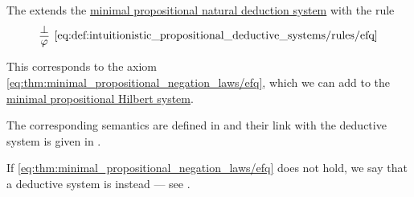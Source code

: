 \begin{definition}\label{def:intuitionistic_propositional_deductive_systems}
  The  extends the \hyperref[def:minimal_propositional_natural_deduction_system]{minimal propositional natural deduction system} with the rule
  \begin{equation*}\taglabel[\logic{EFQ}]{eq:def:intuitionistic_propositional_deductive_systems/rules/efq}
    \begin{prooftree}
      \hypo{ \bot }
      \infer1[\ref{eq:def:intuitionistic_propositional_deductive_systems/rules/efq}]{ \varphi }
    \end{prooftree}
  \end{equation*}
\end{definition}
\begin{comments}
  \item This corresponds to the axiom \eqref{eq:thm:minimal_propositional_negation_laws/efq}, which we can add to the \hyperref[def:minimal_propositional_hilbert_system]{minimal propositional Hilbert system}.
  \item The corresponding semantics are defined in  and their link with the deductive system is given in .
  \item If \eqref{eq:thm:minimal_propositional_negation_laws/efq} does not hold, we say that a deductive system is  instead --- see \cite{StanfordPlato:paraconsistent_logic}.
\end{comments}

